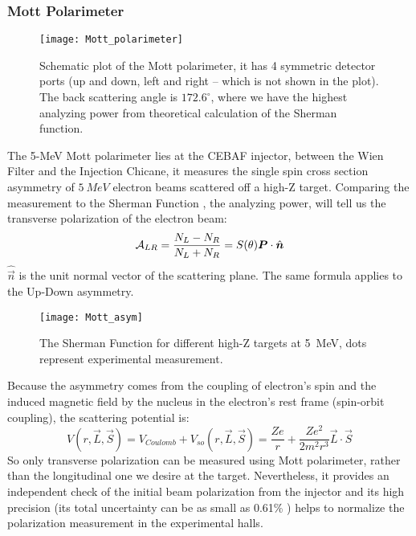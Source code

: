 \subsubsection{Mott Polarimeter}
\begin{figure}
    \centering
    \texttt{[image: Mott\_polarimeter]}
    \caption{Schematic plot of the Mott polarimeter, it has 4 symmetric detector
    ports (up and down, left and right -- which is not shown in the plot). 
    The back scattering angle is $172.6^\circ$, where we have the
    highest analyzing power from theoretical calculation of the Sherman function.
    \cite{PhysRevC.102.015501}}
\end{figure}
The 5-MeV Mott polarimeter lies at the CEBAF injector, between the Wien Filter
and the Injection Chicane, it measures the single spin cross section asymmetry
of $5\ MeV$ electron beams scattered off a high-Z target. Comparing the measurement
to the Sherman Function \cite{PhysRev.103.1601}, the analyzing power, will tell
us the transverse polarization of the electron beam:
\begin{equation}
    \mathcal{A}_{LR} = \frac{N_L - N_R}{N_L + N_R} = S(\theta)\boldsymbol{P}\cdot \hat{\boldsymbol{n}}
\end{equation}
$\hat{\vec{n}}$ is the unit normal vector of the scattering plane. The same formula
applies to the Up-Down asymmetry.
\begin{figure}
    \centering
    \texttt{[image: Mott\_asym]}
    \caption{The Sherman Function for different high-Z targets at 5~MeV, dots
    represent experimental measurement.}
\end{figure}
Because the asymmetry comes from the coupling of electron's spin and the induced
magnetic field by the nucleus in the electron's rest frame (spin-orbit coupling), 
the scattering potential is:
\begin{equation}
    V(r, \vec{L}, \vec{S}) = V_{Coulomb} + V_{so} (r, \vec{L}, \vec{S}) = \frac{Ze}{r} + \frac{Ze^2}{2m^2r^3}\vec{L}\cdot \vec{S}
\end{equation}
So only transverse polarization can be measured using Mott polarimeter, rather
than the longitudinal one we desire at the target. Nevertheless, it provides an
independent check of the initial beam polarization from the injector and its high
precision (its total uncertainty can be as small as 0.61\% \cite{PhysRevC.102.015501}) 
helps to normalize the polarization measurement in the experimental halls.


